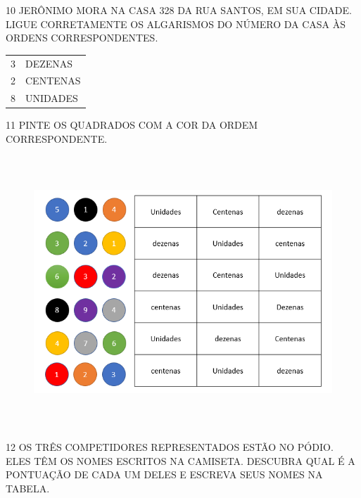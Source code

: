 \num{10} JERÔNIMO MORA NA CASA 328 DA RUA SANTOS, EM SUA
CIDADE. LIGUE CORRETAMENTE OS ALGARISMOS DO NÚMERO DA CASA ÀS ORDENS
CORRESPONDENTES.

\begin{longtable}[]{@{}ll@{}}
\toprule
3 & DEZENAS\tabularnewline
2 & CENTENAS\tabularnewline
8 & UNIDADES\tabularnewline
\bottomrule
\end{longtable}

\num{11} PINTE OS QUADRADOS COM A COR DA ORDEM CORRESPONDENTE.


\begin{figure}[htpb!]
\includegraphics[width=5.90556in,height=4.02083in]{media/image8.png}
\end{figure}


\num{12} OS TRÊS COMPETIDORES REPRESENTADOS ESTÃO NO PÓDIO. ELES TÊM OS NOMES ESCRITOS NA CAMISETA. DESCUBRA QUAL É A PONTUAÇÃO DE CADA UM DELES E ESCREVA SEUS NOMES NA TABELA.



